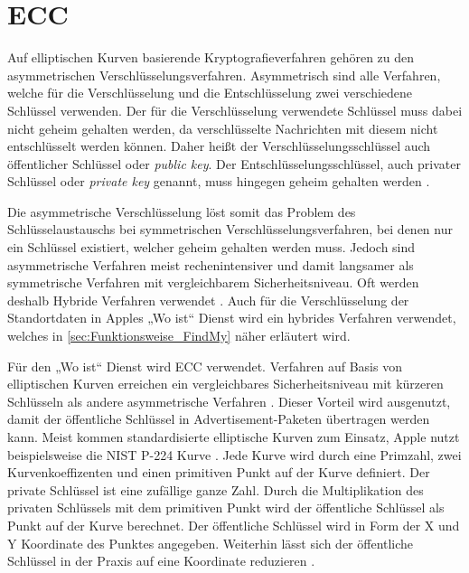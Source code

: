 \section{\ac{ECC}}
\label{sec:ecc}
Auf elliptischen Kurven basierende Kryptografieverfahren gehören zu den asymmetrischen Verschlüsselungsverfahren.
Asymmetrisch sind alle Verfahren, welche für die Verschlüsselung und die Entschlüsselung zwei verschiedene Schlüssel verwenden.
Der für die Verschlüsselung verwendete Schlüssel muss dabei nicht geheim gehalten werden, da verschlüsselte Nachrichten mit diesem nicht entschlüsselt werden können.
Daher heißt der Verschlüsselungsschlüssel auch öffentlicher Schlüssel oder \textit{public key}.
Der Entschlüsselungsschlüssel, auch privater Schlüssel oder \textit{private key} genannt, muss hingegen geheim gehalten werden \cite[S. 173ff.]{Krypto}.

Die asymmetrische Verschlüsselung löst somit das Problem des Schlüsselaustauschs bei symmetrischen Verschlüsselungsverfahren, bei denen nur ein Schlüssel existiert, welcher geheim gehalten werden muss.
Jedoch sind asymmetrische Verfahren meist rechenintensiver und damit langsamer als symmetrische Verfahren mit vergleichbarem Sicherheitsniveau.
Oft werden deshalb Hybride Verfahren verwendet \cite[S. 178f.]{Krypto}.
Auch für die Verschlüsselung der Standortdaten in Apples „Wo ist“ Dienst wird ein hybrides Verfahren verwendet, welches in \autoref{sec:Funktionsweise_FindMy} näher erläutert wird.

Für den „Wo ist“ Dienst wird \ac{ECC} verwendet.
Verfahren auf Basis von elliptischen Kurven erreichen ein vergleichbares Sicherheitsniveau mit kürzeren Schlüsseln als andere asymmetrische Verfahren \cite[S. 273.]{Krypto}.
Dieser Vorteil wird ausgenutzt, damit der öffentliche Schlüssel in Advertisement-Paketen übertragen werden kann.
Meist kommen standardisierte elliptische Kurven zum Einsatz, Apple nutzt beispielsweise die NIST P-224 Kurve \cite{Heinrich_FindMy}.
Jede Kurve wird durch eine Primzahl, zwei Kurvenkoeffizenten und einen primitiven Punkt auf der Kurve definiert.
Der private Schlüssel ist eine zufällige ganze Zahl.
Durch die Multiplikation des privaten Schlüssels mit dem primitiven Punkt wird der öffentliche Schlüssel als Punkt auf der Kurve berechnet.
Der öffentliche Schlüssel wird in Form der X und Y Koordinate des Punktes angegeben.
Weiterhin lässt sich der öffentliche Schlüssel in der Praxis auf eine Koordinate reduzieren \cite[S. 284f.]{Krypto}.


